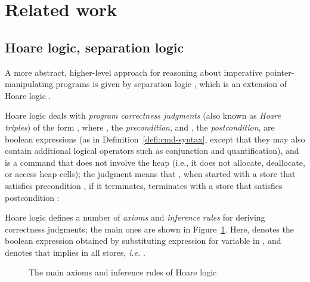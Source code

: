 \documentclass{CSML}
\theoremstyle{definition}\newtheorem{notation}[thm]{Notation}
\theoremstyle{plain}\newtheorem{satz}[thm]{Satz}
\def\ie{{\em i.e.}}
\begin{document}
\section{Related work}\label{sec:related-work}

\subsection{Hoare logic, separation logic}

A more abstract, higher-level approach for reasoning about imperative 
pointer-manipulating programs is given by separation logic 
\cite{seplogic-ohearn,seplogic,ohearn-marktoberdorf}, which is an 
extension of Hoare logic \cite{hoare-logic}.

Hoare logic deals with \emph{program correctness judgments} (also known as 
\emph{Hoare triples}) of the form , where , the 
\emph{precondition}, and , the \emph{postcondition}, are boolean 
expressions (as in Definition~\ref{defi:cmd-syntax}, except that they may 
also contain additional logical operators such as conjunction and quantification), and  is 
a command that does not involve the heap (i.e., it does not allocate, 
deallocate, or access heap cells); the judgment means that , when 
started with a store that satisfies precondition , if it terminates, 
terminates with a store that satisfies postcondition :


Hoare logic defines a number of \emph{axioms} and \emph{inference rules} 
for deriving correctness judgments; the main ones are shown in 
Figure~\ref{fig:hoarelogic}. Here,  denotes the boolean expression 
obtained by substituting expression  for variable  in , and  denotes that  implies  in all stores, \ie{} 
. 

\begin{figure}
\caption{The main axioms and inference rules of Hoare logic}\label{fig:hoarelogic}
\end{figure}
\end{document}
